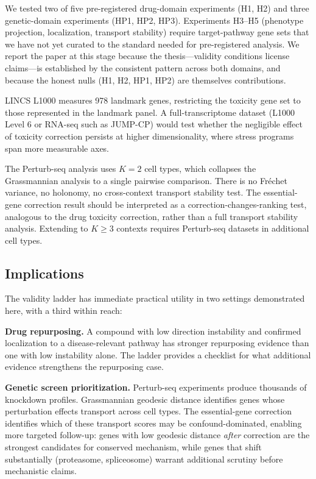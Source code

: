 \documentclass{article}
\begin{document}
We tested two of five pre-registered drug-domain experiments (H1, H2) and
three genetic-domain experiments (HP1, HP2, HP3). Experiments H3--H5
(phenotype projection, localization, transport stability) require
target-pathway gene sets that we have not yet curated to the standard needed
for pre-registered analysis. We report the paper at this stage because the
thesis---validity conditions license claims---is established by the
consistent pattern across both domains, and because the honest nulls (H1,
H2, HP1, HP2) are themselves contributions.

LINCS L1000 measures 978 landmark genes, restricting the toxicity gene set to
those represented in the landmark panel. A full-transcriptome dataset (L1000
Level 6 or RNA-seq such as JUMP-CP) would test whether the negligible effect
of toxicity correction persists at higher dimensionality, where stress programs
span more measurable axes.

The Perturb-seq analysis uses $K = 2$ cell types, which collapses the
Grassmannian analysis to a single pairwise comparison. There is no Fr\'echet
variance, no holonomy, no cross-context transport stability test. The
essential-gene correction result should be interpreted as a
correction-changes-ranking test, analogous to the drug toxicity correction,
rather than a full transport stability analysis. Extending to $K \geq 3$
contexts requires Perturb-seq datasets in additional cell types.

\subsection{Implications}

The validity ladder has immediate practical utility in two settings
demonstrated here, with a third within reach:

\textbf{Drug repurposing.} A compound with low direction instability and
confirmed localization to a disease-relevant pathway has stronger repurposing
evidence than one with low instability alone. The ladder provides a checklist
for what additional evidence strengthens the repurposing case.

\textbf{Genetic screen prioritization.} Perturb-seq experiments produce
thousands of knockdown profiles. Grassmannian geodesic distance identifies
genes whose perturbation effects transport across cell types. The
essential-gene correction identifies which of these transport scores may be
confound-dominated, enabling more targeted follow-up: genes with low
geodesic distance \emph{after} correction are the strongest candidates for
conserved mechanism, while genes that shift substantially (proteasome,
spliceosome) warrant additional scrutiny before mechanistic claims.
\end{document}
